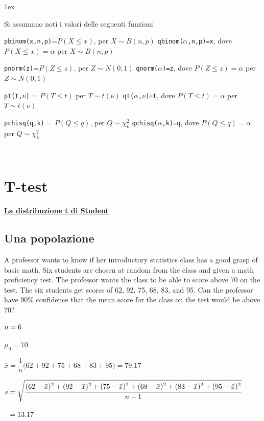 \documentclass[11pt,openany]{book}
\begin{document}
\parskip1ex
{\hrulefill\scriptsize

Si assumano noti i valori delle seguenti funzioni

{\tt pbinom(x,n,p)}=$P(X\le x)$, per $X\sim B(n,p)$
\hfill 
{\tt qbinom($\alpha$,n,p)=x},  dove $P(X\le x)=\alpha$ per $X\sim B(n,p)$

{\tt pnorm(z)}=$P(Z\le z)$, per $Z\sim N(0,1)$
\hfill 
{\tt qnorm($\alpha$)=z},  dove $P(Z\le z)=\alpha$ per $Z\sim N(0,1)$

{\tt pt(t,$\nu$)} = $P(T\le t)$ per $T\sim t(\nu)$
\hfill
{\tt qt($\alpha$,$\nu$)=t}, dove $P(T\le t)=\alpha$ per $T\sim t(\nu)$

{\tt pchisq(q,k)} = $P(Q\le q)$, per $Q\sim \chi^2_k$
\hfill
{\tt qchisq($\alpha$,k)=q},  dove $P(Q\le q)=\alpha$ per $Q\sim \chi^2_k$
\par
}



\hfill{}\clearpage\
\section{T-test}
\label{T-test}
\hfill\textbf{{\color{brown}\hyperref[tStudent]{La distribuzione t di Student \faShare}}}
\subsection{Una popolazione}
A professor wants to know if her introductory statistics class has a good grasp of basic math. Six students are chosen at random from the class and given a math proficiency test. The professor wants the class to be able to score above 70 on the test. The six students get scores of 62, 92, 75, 68, 83, and 95. Can the professor have 90\%  confidence that the mean score for the class on the test would be above 70?

$\strut n=6$

$\mu_0=70$

$\bar x =\dfrac1n\big(62+92+75+68+83+95\big) =79.17$

$s = \sqrt{\dfrac{\strut(62-\bar x)^2+(92-\bar x)^2+(75-\bar x)^2+(68-\bar x)^2+(83-\bar x)^2+(95-\bar x)^2}{n-1}}$

$\strut\phantom{s} = 13.17$
\end{document}

